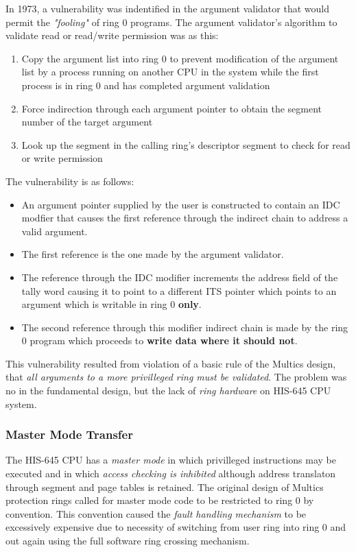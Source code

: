 In 1973, a vulnerability was indentified in the argument validator that would permit the \textit{"fooling"} of ring 0 
programs.
The argument validator's algorithm to validate read or read/write permission was as this:
\begin{enumerate}
    \item Copy the argument list into ring 0 to prevent modification of the argument list by a process 
    running on another CPU in the system while the first process is in ring 0 and has completed argument validation
    \item Force indirection through each argument pointer to obtain the segment number of the target argument
    \item Look up the segment in the calling ring's descriptor segment to check for read or write permission
\end{enumerate}

The vulnerability is as follows:
\begin{itemize}
    \item An argument pointer supplied by the user is constructed to contain an IDC modfier that causes the first 
    reference through the indirect chain to address a valid argument.
    \item The first reference is the one made by the argument validator.
    \item The reference through the IDC modifier increments the address field of the tally word causing it to point 
    to a different ITS pointer which points to an argument which is writable in ring 0 \textbf{only}.
    \item The second reference through this modifier indirect chain is made by the ring 0 program which proceeds 
    to \textbf{write data where it should not}. 
\end{itemize}

This vulnerability resulted from violation of a basic rule of the Multics design, that \textit{all arguments to a more 
privilleged ring must be validated}.
The problem was no in the fundamental design, but the lack of \textit{ring hardware} on HIS-645 CPU system.

\subsubsection{Master Mode Transfer}

The HIS-645 CPU has a \textit{master mode} in which privilleged instructions may be executed and in 
which \textit{access checking is inhibited} although address translaton through segment and page 
tables is retained. 
The original design of Multics protection rings called for master mode code to be restricted to ring 0 by convention.
This convention caused the \textit{fault handling mechanism} to be excessively expensive due to necessity of switching
from user ring into ring 0 and out again using the full software ring crossing mechanism.

